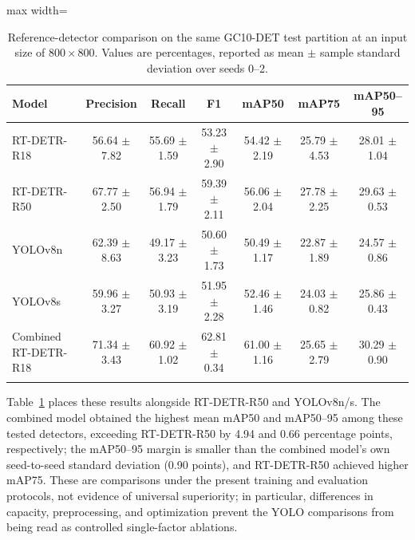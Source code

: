 \documentclass[pdflatex,sn-mathphys-num,iicol]{sn-jnl}
\begin{document}
\begin{table}[t]
\centering
\caption{Reference-detector comparison on the same GC10-DET test partition at an input size of $800\times800$. Values are percentages, reported as mean $\pm$ sample standard deviation over seeds 0--2.}
\label{tab:gc10reference}
\scriptsize
\setlength{\tabcolsep}{4pt}
\begin{adjustbox}{max width=\textwidth}
\begin{tabular}{@{}lcccccc@{}}
\toprule
Model & Precision & Recall & F1 & mAP50 & mAP75 & mAP50--95 \\
\midrule
RT-DETR-R18 & 56.64 $\pm$ 7.82 & 55.69 $\pm$ 1.59 & 53.23 $\pm$ 2.90 & 54.42 $\pm$ 2.19 & 25.79 $\pm$ 4.53 & 28.01 $\pm$ 1.04 \\
RT-DETR-R50 & 67.77 $\pm$ 2.50 & 56.94 $\pm$ 1.79 & 59.39 $\pm$ 2.11 & 56.06 $\pm$ 2.04 & 27.78 $\pm$ 2.25 & 29.63 $\pm$ 0.53 \\
YOLOv8n & 62.39 $\pm$ 8.63 & 49.17 $\pm$ 3.23 & 50.60 $\pm$ 1.73 & 50.49 $\pm$ 1.17 & 22.87 $\pm$ 1.89 & 24.57 $\pm$ 0.86 \\
YOLOv8s & 59.96 $\pm$ 3.27 & 50.93 $\pm$ 3.19 & 51.95 $\pm$ 2.28 & 52.46 $\pm$ 1.46 & 24.03 $\pm$ 0.82 & 25.86 $\pm$ 0.43 \\
Combined RT-DETR-R18 & 71.34 $\pm$ 3.43 & 60.92 $\pm$ 1.02 & 62.81 $\pm$ 0.34 & 61.00 $\pm$ 1.16 & 25.65 $\pm$ 2.79 & 30.29 $\pm$ 0.90 \\
\botrule
\end{tabular}
\end{adjustbox}
\end{table}

Table~\ref{tab:gc10reference} places these results alongside RT-DETR-R50 and YOLOv8n/s. The combined model obtained the highest mean mAP50 and mAP50--95 among these tested detectors, exceeding RT-DETR-R50 by 4.94 and 0.66 percentage points, respectively; the mAP50--95 margin is smaller than the combined model's own seed-to-seed standard deviation (0.90 points), and RT-DETR-R50 achieved higher mAP75. These are comparisons under the present training and evaluation protocols, not evidence of universal superiority; in particular, differences in capacity, preprocessing, and optimization prevent the YOLO comparisons from being read as controlled single-factor ablations.
\end{document}
